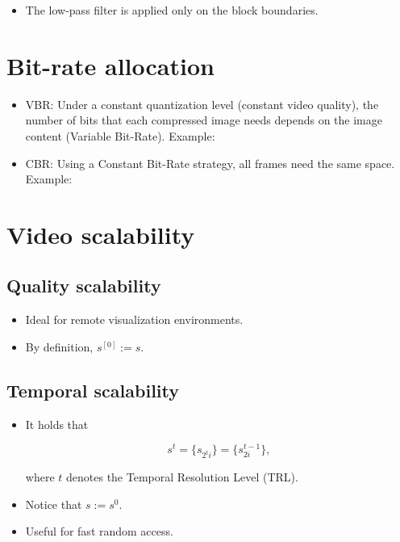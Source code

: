 
\begin{itemize}
\tightlist
\item
  The low-pass filter is applied only on the block boundaries.
\end{itemize}

\section{Bit-rate allocation}
\begin{itemize}
\item
  VBR: Under a constant quantization level (constant video quality), the
  number of bits that each compressed image needs depends on the image
  content (Variable Bit-Rate). Example:

\item
  CBR: Using a Constant Bit-Rate strategy, all frames need the same
  space. Example:
\end{itemize}

\section{Video scalability}
\subsection{Quality scalability}
\begin{itemize}
\item
  Ideal for remote visualization environments.
\item
  By definition, $s^{[0]}:=s$.
\end{itemize}

\subsection{Temporal scalability}
\begin{itemize}
\item
  It holds that

  \begin{equation}
    s^{t}=\{s_{2^t i}\}=\{s_{2i}^{t-1}\},
  \end{equation}

  where $t$ denotes the Temporal Resolution Level (TRL).
\item
  Notice that $s:=s^{0}$.
\item
  Useful for fast random access.
\end{itemize}

